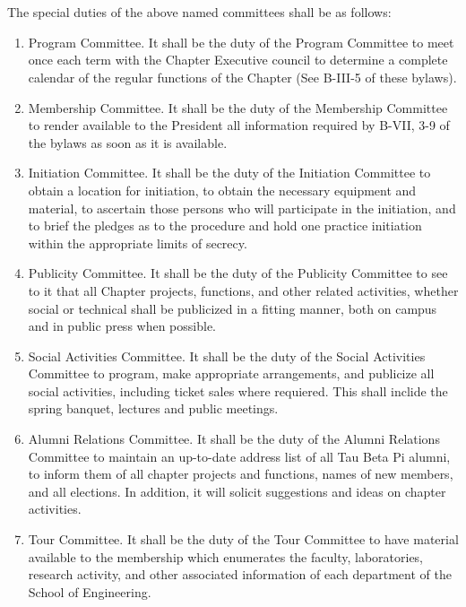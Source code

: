 \documentclass[12pt]{constitution}
\begin{document}
\section{}
The special duties of the above named committees shall be as follows:
\begin{enumerate}
	\item Program Committee. It shall be the duty of the Program Committee to meet once each term with the Chapter Executive council to determine a complete calendar of the regular functions of the Chapter (See B-III-5 of these bylaws).
	\item Membership Committee. It shall be the duty of the Membership Committee to render available to the President all information required by B-VII, 3-9 of the bylaws as soon as it is available.
	\item Initiation Committee. It shall be the duty of the Initiation Committee to obtain a location for initiation, to obtain the necessary equipment and material, to ascertain those persons who will participate in the initiation, and to brief the pledges as to the procedure and hold one practice initiation within the appropriate limits of secrecy. 
	\item Publicity Committee. It shall be the duty of the Publicity Committee to see to it that all Chapter projects, functions, and other related activities, whether social or technical shall be publicized in a fitting manner, both on campus and in public press when possible.
	\item Social Activities Committee. It shall be the duty of the Social Activities Committee to program, make appropriate arrangements, and publicize all social activities, including ticket sales where requiered. This shall inclide the spring banquet, lectures and public meetings.
	\item Alumni Relations Committee. It shall be the duty of the Alumni Relations Committee to maintain an up-to-date address list of all Tau Beta Pi alumni, to inform them of all chapter projects and functions, names of new members, and all elections. In addition, it will solicit suggestions and ideas on chapter activities.
	\item Tour Committee. It shall be the duty of the Tour Committee to have material available to the membership which enumerates the faculty, laboratories, research activity, and other associated information of each department of the School of Engineering.
\end{enumerate}

\end{document}
